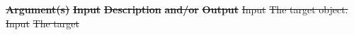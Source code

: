 \documentclass[12pt]{report} %
\providecommand{\DIFdeltex}[1]{{\protect\color{red}\sout{#1}}}                      %
\providecommand{\DIFdelend}{} %
\providecommand{\DIFdel}[1]{\texorpdfstring{\DIFdeltex{#1}}{}} %
\DeclareRobustCommand{\DIFdelend}{\DIFOaddend \let\includegraphics\DIFOincludegraphics} %
\begin{document}
\textbf{\DIFdel{Argument(s)}} %
\textbf{\DIFdel{Input }} %
\textbf{\DIFdel{Description}} %
\textbf{\DIFdel{and/or}} %
\textbf{\DIFdel{Output}} %
\DIFdel{Input  }%
\DIFdel{The target object. }%
\DIFdel{Input  }%
\DIFdel{The target }\DIFdelend %
\end{document}
